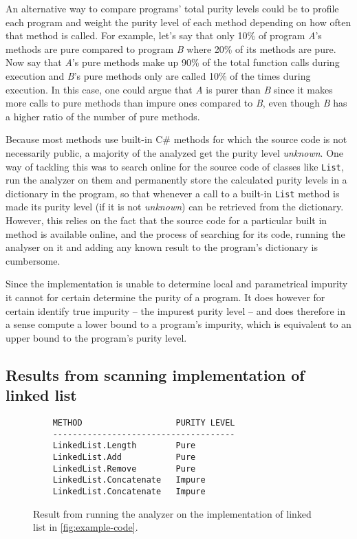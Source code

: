 \documentclass[a4paper,12pt]{article}
\begin{document}
An alternative way to compare programs' total purity levels could be to profile each program and weight the purity level of each method depending on how often that method is called. For example, let's say that only 10\% of program \textit{A}'s methods are pure compared to program \textit{B} where 20\% of its methods are pure. Now say that \textit{A}'s pure methods make up 90\% of the total function calls during execution and \textit{B}'s pure methods only are called 10\% of the times during execution. In this case, one could argue that \textit{A} is purer than \textit{B} since it makes more calls to pure methods than impure ones compared to \textit{B}, even though \textit{B} has a higher ratio of the number of pure methods.

Because most methods use built-in C\# methods for which the source code is not necessarily public, a majority of the analyzed get the purity level \textit{unknown}. One way of tackling this was to search online for the source code of classes like \texttt{List}, run the analyzer on them and permanently store the calculated purity levels in a dictionary in the program, so that whenever a call to a built-in \texttt{List} method is made its purity level (if it is not \textit{unknown}) can be retrieved from the dictionary. However, this relies on the fact that the source code for a particular built in method is available online, and the process of searching for its code, running the analyser on it and adding any known result to the program's dictionary is cumbersome.

Since the implementation is unable to determine local and parametrical impurity it cannot for certain determine the purity of a program. It does however for certain identify true impurity -- the impurest purity level -- and does therefore in a sense compute a lower bound to a program's impurity, which is equivalent to an upper bound to the program's purity level.

\subsection{Results from scanning implementation of linked list} \label{sub:results-from-scanning-the-example}

\begin{figure}[htpb]
  \centering
  \begin{minipage}{\linewidth} %
    \begin{lstlisting}
    METHOD                   PURITY LEVEL
    -------------------------------------
    LinkedList.Length        Pure
    LinkedList.Add           Pure
    LinkedList.Remove        Pure
    LinkedList.Concatenate   Impure
    LinkedList.Concatenate   Impure
    \end{lstlisting}
  \end{minipage}
  \caption{Result from running the analyzer on the implementation of linked list in \autoref{fig:example-code}.}
  \label{fig:example-result}
\end{figure}
\end{document}
